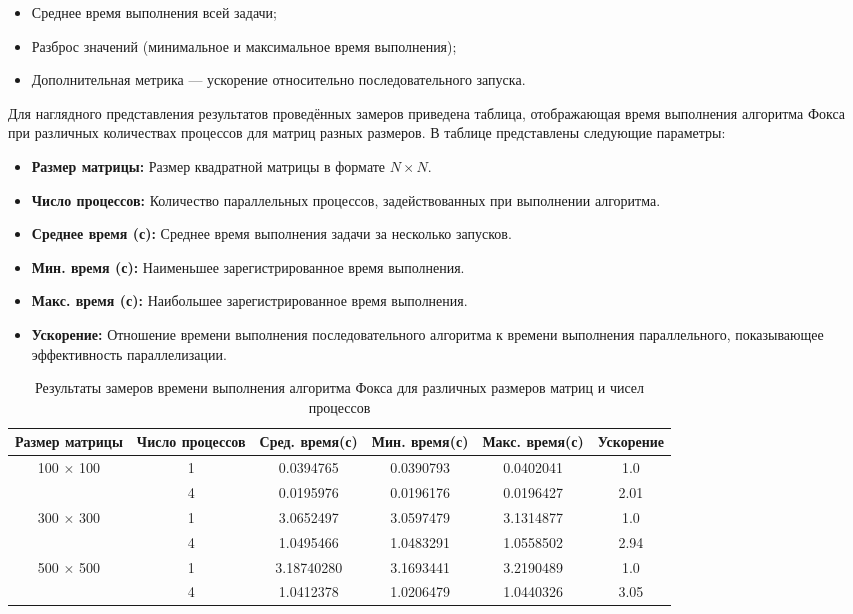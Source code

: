 \documentclass{report}
\begin{document}
\begin{itemize}
    \item Среднее время выполнения всей задачи;
    \item Разброс значений (минимальное и максимальное время выполнения);
    \item Дополнительная метрика — ускорение относительно последовательного запуска.
\end{itemize}

Для наглядного представления результатов проведённых замеров приведена таблица, отображающая время выполнения алгоритма Фокса при различных количествах процессов для матриц разных размеров. В таблице представлены следующие параметры:

\begin{itemize}
    \item \textbf{Размер матрицы:} Размер квадратной матрицы в формате $N \times N$.
    \item \textbf{Число процессов:} Количество параллельных процессов, задействованных при выполнении алгоритма.
    \item \textbf{Среднее время (с):} Среднее время выполнения задачи за несколько запусков.
    \item \textbf{Мин. время (с):} Наименьшее зарегистрированное время выполнения.
    \item \textbf{Макс. время (с):} Наибольшее зарегистрированное время выполнения.
    \item \textbf{Ускорение:} Отношение времени выполнения последовательного алгоритма к времени выполнения параллельного, показывающее эффективность параллелизации.
\end{itemize}

\begin{table}[h]
    \centering
    \caption{Результаты замеров времени выполнения алгоритма Фокса для различных размеров матриц и чисел процессов}
    \label{tab:performance_tests}
    \begin{tabular}{|c|c|c|c|c|c|}
        \hline
        \textbf{Размер матрицы} & \textbf{Число процессов} & \textbf{Сред. время(с)} & \textbf{Мин. время(с)} & \textbf{Макс. время(с)} & \textbf{Ускорение} \\
        \hline
        \multirow{2}{*}{100 $\times$ 100} & 1  & 0.0394765 & 0.0390793 & 0.0402041 & 1.0 \\
        \cline{2-6}
                                         & 4  & 0.0195976 & 0.0196176 & 0.0196427 & 2.01 \\
        \hline
        \multirow{2}{*}{300 $\times$ 300} & 1  & 3.0652497 & 3.0597479 & 3.1314877 & 1.0 \\
        \cline{2-6}
                                         & 4  & 1.0495466 & 1.0483291 & 1.0558502 & 2.94 \\
        \hline
        \multirow{2}{*}{500 $\times$ 500} & 1  & 3.18740280 & 3.1693441 & 3.2190489 & 1.0 \\
        \cline{2-6}
                                         & 4  & 1.0412378 & 1.0206479 & 1.0440326 & 3.05 \\
        \hline
    \end{tabular}
\end{table}
\end{document}
